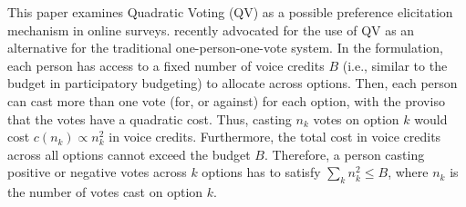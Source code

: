 {{%

This paper examines Quadratic Voting (QV) as a possible preference elicitation mechanism in online surveys. \textcite{posner2018radical} recently advocated for the use of QV as an alternative for the traditional one-person-one-vote system. In the \textcite{posner2018radical} formulation, each person has access to a fixed number of voice credits $B$ (i.e., similar to the budget in participatory budgeting) to allocate across options. Then, each person can cast more than one vote (for, or against) for each option, with the proviso that the votes have a quadratic cost. Thus, casting $n_k$ votes on option $k$ would cost $c(n_k) \propto n_k^2$ in voice credits. Furthermore, the total cost in voice credits across all options cannot exceed the budget $B$. Therefore, a person casting positive or negative votes across $k$ options has to satisfy $\sum_k n_k^2 \leqslant B$, where $n_k$ is the number of votes cast on option $k$. 

}}
